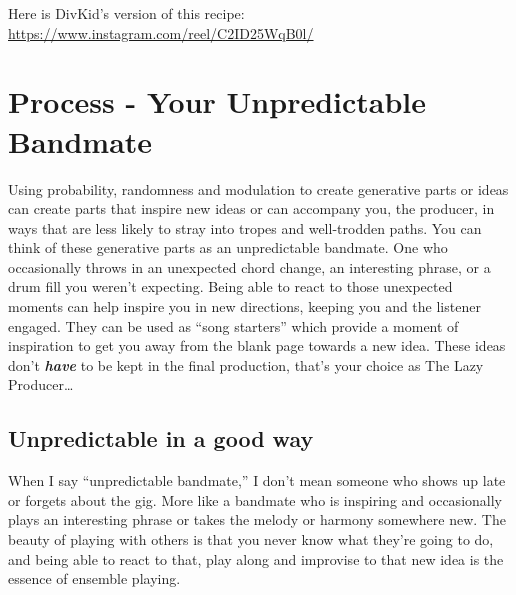 \documentclass[
  12pt,
  letterpaper,
  oneside,
  open=any]{scrbook}
\begin{document}
Here is DivKid's version of this recipe:
\url{https://www.instagram.com/reel/C2ID25WqB0l/}


\chapter{Process - Your Unpredictable
Bandmate}\label{Chapter-023-Process-Your_Unpredictable_Bandmate}

\begin{tcolorbox}[enhanced jigsaw, breakable, left=2mm, leftrule=.75mm, toprule=.15mm, opacitybacktitle=0.6, toptitle=1mm, coltitle=black, colback=white, colbacktitle=quarto-callout-tip-color!10!white, opacityback=0, rightrule=.15mm, bottomrule=.15mm, titlerule=0mm, title=\textcolor{quarto-callout-tip-color}{\faLightbulb}\hspace{0.5em}{Key idea}, arc=.35mm, bottomtitle=1mm, colframe=quarto-callout-tip-color-frame]

Using probability, randomness and modulation to create generative parts
or ideas can create parts that inspire new ideas or can accompany you,
the producer, in ways that are less likely to stray into tropes and
well-trodden paths. You can think of these generative parts as an
unpredictable bandmate. One who occasionally throws in an unexpected
chord change, an interesting phrase, or a drum fill you weren't
expecting. Being able to react to those unexpected moments can help
inspire you in new directions, keeping you and the listener engaged.
They can be used as ``song starters'' which provide a moment of
inspiration to get you away from the blank page towards a new idea.
These ideas don't \textbf{\emph{have}} to be kept in the final
production, that's your choice as The Lazy Producer\ldots{}

\end{tcolorbox}

\section{Unpredictable in a good way}\label{unpredictable-in-a-good-way}

When I say ``unpredictable bandmate,'' I don't mean someone who shows up
late or forgets about the gig. More like a bandmate who is inspiring and
occasionally plays an interesting phrase or takes the melody or harmony
somewhere new. The beauty of playing with others is that you never know
what they're going to do, and being able to react to that, play along
and improvise to that new idea is the essence of ensemble playing.
\end{document}
